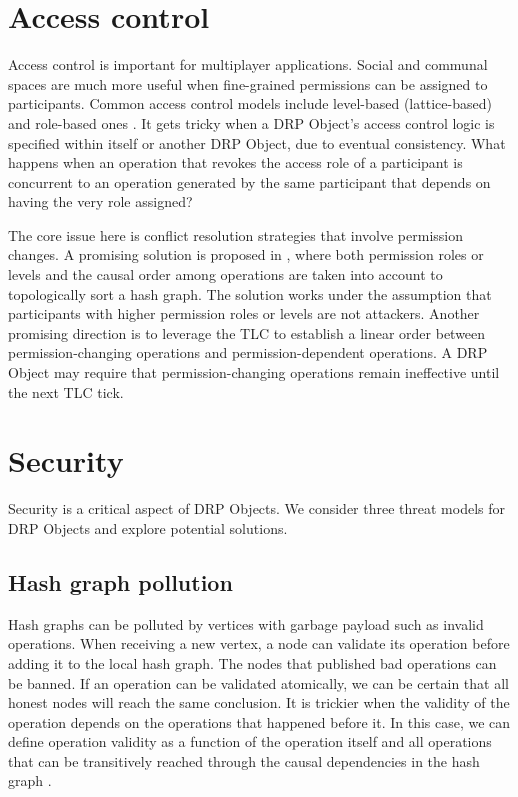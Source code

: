 \documentclass{article}
\begin{document}
\section{Access control}
\label{sec:headings}

Access control is important for multiplayer applications. Social and communal spaces are much more useful when fine-grained permissions can be assigned to participants. Common access control models include level-based (lattice-based) \cite{LBAC} and role-based ones \cite{RBAC}. It gets tricky when a DRP Object's access control logic is specified within itself or another DRP Object, due to eventual consistency. What happens when an operation that revokes the access role of a participant is concurrent to an operation generated by the same participant that depends on having the very role assigned?

The core issue here is conflict resolution strategies that involve permission changes. A promising solution is proposed in \cite{Matrix}, where both permission roles or levels and the causal order among operations are taken into account to topologically sort a hash graph. The solution works under the assumption that participants with higher permission roles or levels are not attackers. Another promising direction is to leverage the TLC to establish a linear order between permission-changing operations and permission-dependent operations. A DRP Object may require that permission-changing operations remain ineffective until the next TLC tick.

\section{Security}
\label{sec:headings}

Security is a critical aspect of DRP Objects. We consider three threat models for DRP Objects and explore potential solutions.

\subsection {Hash graph pollution}
Hash graphs can be polluted by vertices with garbage payload such as invalid operations. When receiving a new vertex, a node can validate its operation before adding it to the local hash graph. The nodes that published bad operations can be banned. If an operation can be validated atomically, we can be certain that all honest nodes will reach the same conclusion. It is trickier when the validity of the operation depends on the operations that happened before it. In this case, we can define operation validity as a function of the operation itself and all operations that can be transitively reached through the causal dependencies in the hash graph \cite{BFT-CRDT}.
\end{document}
